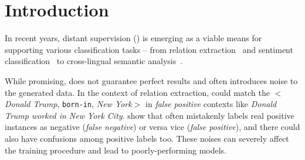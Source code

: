\section{Introduction}

In recent years, distant supervision (\DS) is emerging as a viable means for supporting various classification tasks -- from relation extraction~\cite{mintz2009distant} and sentiment classification~\cite{go2009twitter} to cross-lingual semantic
analysis~\cite{fang2016learning}. 



While promising, \DS does not guarantee perfect results and often introduces noise to the
generated data. In the context of relation extraction, \DS could match the  $<$\emph{Donald Trump},
\texttt{born-in}, \emph{New York}$>$  in \emph{false positive} contexts like \emph{Donald Trump worked in New York City}.
 show that \DS often mistakenly labels real positive instances as negative (\emph{false negative}) or
versa vice (\emph{false positive}), and there could also have confusions among positive labels too. These noises can
severely affect the training
procedure and lead to poorly-performing models.

